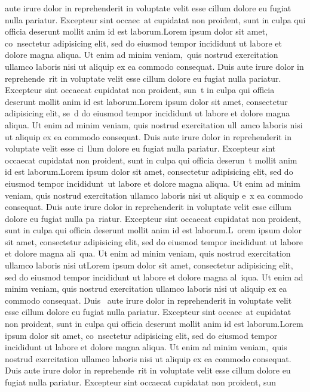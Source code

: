\documentclass{paper}
\begin{document}
aute irure dolor in reprehenderit in voluptate velit esse cillum dolore eu fugiat nulla pariatur. Excepteur sint occaec\
at cupidatat non proident, sunt in culpa qui officia deserunt mollit anim id est laborum.Lorem ipsum dolor sit amet, co\
nsectetur adipisicing elit, sed do eiusmod tempor incididunt ut labore et dolore magna aliqua. Ut enim ad minim veniam,\
 quis nostrud exercitation ullamco laboris nisi ut aliquip ex ea commodo consequat. Duis aute irure dolor in reprehende\
rit in voluptate velit esse cillum dolore eu fugiat nulla pariatur. Excepteur sint occaecat cupidatat non proident, sun\
t in culpa qui officia deserunt mollit anim id est laborum.Lorem ipsum dolor sit amet, consectetur adipisicing elit, se\
d do eiusmod tempor incididunt ut labore et dolore magna aliqua. Ut enim ad minim veniam, quis nostrud exercitation ull\
amco laboris nisi ut aliquip ex ea commodo consequat. Duis aute irure dolor in reprehenderit in voluptate velit esse ci\
llum dolore eu fugiat nulla pariatur. Excepteur sint occaecat cupidatat non proident, sunt in culpa qui officia deserun\
t mollit anim id est laborum.Lorem ipsum dolor sit amet, consectetur adipisicing elit, sed do eiusmod tempor incididunt\
 ut labore et dolore magna aliqua. Ut enim ad minim veniam, quis nostrud exercitation ullamco laboris nisi ut aliquip e\
x ea commodo consequat. Duis aute irure dolor in reprehenderit in voluptate velit esse cillum dolore eu fugiat nulla pa\
riatur. Excepteur sint occaecat cupidatat non proident, sunt in culpa qui officia deserunt mollit anim id est laborum.L\
orem ipsum dolor sit amet, consectetur adipisicing elit, sed do eiusmod tempor incididunt ut labore et dolore magna ali\
qua. Ut enim ad minim veniam, quis nostrud exercitation ullamco laboris nisi utLorem ipsum dolor sit amet, consectetur adipisicing elit, sed do eiusmod tempor incididunt ut labore et dolore magna al\
iqua. Ut enim ad minim veniam, quis nostrud exercitation ullamco laboris nisi ut aliquip ex ea commodo consequat. Duis \
aute irure dolor in reprehenderit in voluptate velit esse cillum dolore eu fugiat nulla pariatur. Excepteur sint occaec\
at cupidatat non proident, sunt in culpa qui officia deserunt mollit anim id est laborum.Lorem ipsum dolor sit amet, co\
nsectetur adipisicing elit, sed do eiusmod tempor incididunt ut labore et dolore magna aliqua. Ut enim ad minim veniam,\
 quis nostrud exercitation ullamco laboris nisi ut aliquip ex ea commodo consequat. Duis aute irure dolor in reprehende\
rit in voluptate velit esse cillum dolore eu fugiat nulla pariatur. Excepteur sint occaecat cupidatat non proident, sun\
\end{document}
